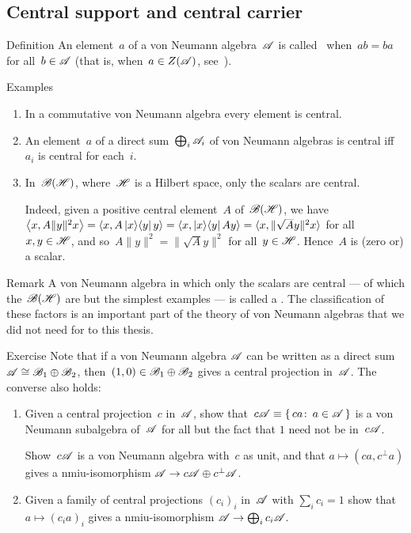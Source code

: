 \documentclass[a]{subfiles}
\begin{document}
\subsection{Central support and central carrier}
\begin{parsec}%
\begin{point}{Definition}%
An element~$a$ of a von Neumann algebra~$\mathscr{A}$
is called~
when~$ab=ba$ for all~$b\in\mathscr{A}$
(that is, when~$a\in Z(\mathscr{A})$, see~).
\end{point}
\begin{point}{Examples}%
\begin{enumerate}
\item
In a commutative von Neumann algebra
every element is central.
\item
An element~$a$ of a direct sum~$\bigoplus_i \mathscr{A}_i$
of von Neumann algebras
is central iff~$a_i$ is central for each~$i$.
\item
In~$\mathscr{B}(\mathscr{H})$,
where~$\mathscr{H}$ is a Hilbert space,
only the scalars are central.

Indeed,
given a positive central element~$A$ 
of~$\mathscr{B}(\mathscr{H})$,
we have $\left<x, A\|y\|^2 x\right>
= \left<x,A \left|x\right>\!\left<y\right| y\right>
= \left<x,\left|x\right>\!\left<y\right|A y\right>
= \left<x,\smash{\|\sqrt{A}y\|^2 }x\right>$
for all~$x,y\in\mathscr{H}$,
and so~$A\|y\|^2= \|\sqrt{A}y\|^2$
for all~$y\in\mathscr{H}$.
Hence~$A$ is (zero or) a scalar.

\end{enumerate}
\end{point}
\begin{point}{Remark}%
A von Neumann algebra
in which only the scalars are central
--- of which the~$\mathscr{B}(\mathscr{H})$ are but the simplest examples ---
is called a .
The classification of these factors
is an important part
of the theory of von Neumann algebras
that we did not need for to this thesis.
\end{point}
\begin{point}{Exercise}%
Note that if a von Neumann algebra
$\mathscr{A}$ can be written as
a direct sum $\mathscr{A}\cong \mathscr{B}_1\oplus \mathscr{B}_2$,
then~$(1,0)\in\mathscr{B}_1\oplus\mathscr{B}_2$ gives
a central projection in~$\mathscr{A}$.
The converse also holds:
\begin{enumerate}
\item
Given a central projection~$c$ in~$\mathscr{A}$,
show that~$c\mathscr{A} \equiv \{\,ca\colon\, a\in\mathscr{A}\,\}$ 
is a von Neumann subalgebra of~$\mathscr{A}$
for all but the fact that $1$ need not be in~$c\mathscr{A}$.

Show~$c\mathscr{A}$
is a von Neumann algebra with~$c$ as unit,
and that $a\mapsto (ca,c^\perp a)$
gives a nmiu-isomorphism
$\mathscr{A}\to c\mathscr{A}\oplus c^\perp \mathscr{A}$.
\item
Given a family of central projections $(c_i)_i$ in~$\mathscr{A}$
with $\sum_i c_i=1$
show that $a\mapsto (c_ia)_i$
gives a nmiu-isomorphism $\mathscr{A}\to\bigoplus_i c_i \mathscr{A}$.
\end{enumerate}
\end{point}
\end{parsec}
\end{document}
